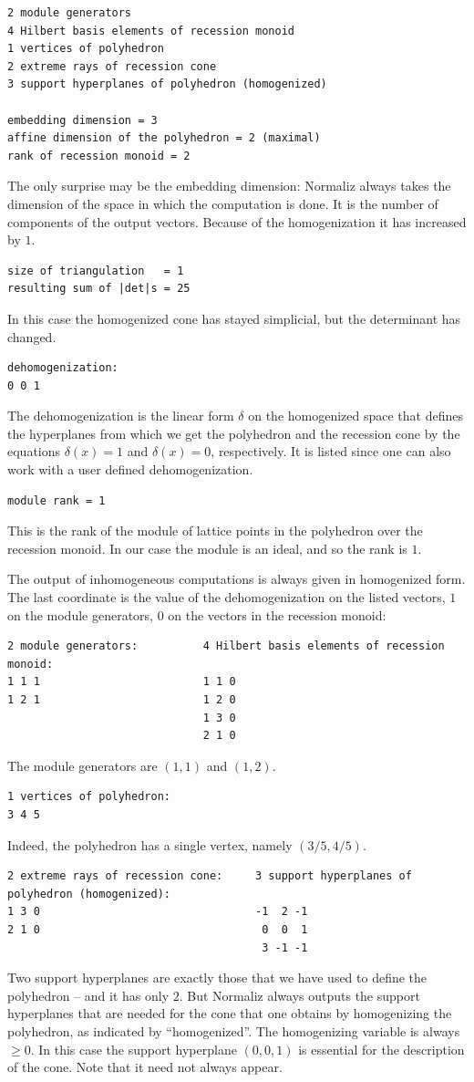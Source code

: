 \begin{Verbatim}
2 module generators
4 Hilbert basis elements of recession monoid
1 vertices of polyhedron
2 extreme rays of recession cone
3 support hyperplanes of polyhedron (homogenized)

embedding dimension = 3
affine dimension of the polyhedron = 2 (maximal)
rank of recession monoid = 2
\end{Verbatim}
The only surprise may be the embedding dimension: Normaliz always takes the dimension of the space in which the computation is done. It is the number of components of the output vectors. Because of the homogenization it has increased by $1$.
\begin{Verbatim}
size of triangulation   = 1
resulting sum of |det|s = 25
\end{Verbatim}
In this case the homogenized cone has stayed simplicial, but the determinant has changed.
\begin{Verbatim}
dehomogenization:
0 0 1
\end{Verbatim}
The dehomogenization is the linear form $\delta$ on the homogenized space that defines the hyperplanes from which we get the polyhedron and the recession cone by the equations $\delta(x)=1$ and $\delta(x)=0$, respectively. It is listed since one can also work with a user defined dehomogenization.
\begin{Verbatim}
module rank = 1
\end{Verbatim}
This is the rank of the module of lattice points in the polyhedron over the recession monoid. In our case the module is an ideal, and so the rank is $1$.

The output of inhomogeneous computations is always given in homogenized form. The last coordinate is the value of the dehomogenization on the listed vectors, $1$ on the module generators, $0$ on the vectors in the recession monoid:
\begin{Verbatim}
2 module generators:          4 Hilbert basis elements of recession monoid:
1 1 1                         1 1 0
1 2 1                         1 2 0
                              1 3 0
                              2 1 0
\end{Verbatim}
The module generators are $(1,1)$ and $(1,2)$.
\begin{Verbatim}
1 vertices of polyhedron:
3 4 5
\end{Verbatim}
Indeed, the polyhedron has a single vertex, namely $(3/5,4/5)$.
\begin{Verbatim}
2 extreme rays of recession cone:     3 support hyperplanes of polyhedron (homogenized):
1 3 0                                 -1  2 -1
2 1 0                                  0  0  1
                                       3 -1 -1
\end{Verbatim}
Two support hyperplanes are exactly those that we have used to define the polyhedron -- and it has only $2$. But Normaliz always outputs the support hyperplanes that are needed for the cone that one obtains by homogenizing the polyhedron, as indicated by ``homogenized''. The homogenizing variable is always $\ge 0$. In this case the support hyperplane $(0,0,1)$ is essential for the description of the cone. Note that it need not always appear.


